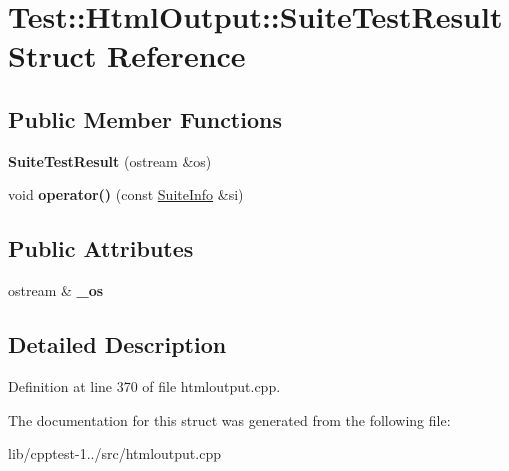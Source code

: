 \hypertarget{struct_test_1_1_html_output_1_1_suite_test_result}{}\section{Test\+:\+:Html\+Output\+:\+:Suite\+Test\+Result Struct Reference}
\label{struct_test_1_1_html_output_1_1_suite_test_result}
\subsection*{Public Member Functions}
\begin{DoxyCompactItemize}
\item 
{\bfseries Suite\+Test\+Result} (ostream \&os)\hypertarget{struct_test_1_1_html_output_1_1_suite_test_result_a4bbe1cf91cbb03755cbe3256dccdfb04}{}\label{struct_test_1_1_html_output_1_1_suite_test_result_a4bbe1cf91cbb03755cbe3256dccdfb04}

\item 
void {\bfseries operator()} (const \hyperlink{struct_test_1_1_collector_output_1_1_suite_info}{Suite\+Info} \&si)\hypertarget{struct_test_1_1_html_output_1_1_suite_test_result_ab3b121595de56c1eb22ca49c60aeb1be}{}\label{struct_test_1_1_html_output_1_1_suite_test_result_ab3b121595de56c1eb22ca49c60aeb1be}

\end{DoxyCompactItemize}
\subsection*{Public Attributes}
\begin{DoxyCompactItemize}
\item 
ostream \& {\bfseries \+\_\+os}\hypertarget{struct_test_1_1_html_output_1_1_suite_test_result_ad7f03c32f297e7010f0a091fd7b722e8}{}\label{struct_test_1_1_html_output_1_1_suite_test_result_ad7f03c32f297e7010f0a091fd7b722e8}

\end{DoxyCompactItemize}


\subsection{Detailed Description}


Definition at line 370 of file htmloutput.\+cpp.



The documentation for this struct was generated from the following file\+:\begin{DoxyCompactItemize}
\item 
lib/cpptest-\/1../src/htmloutput.\+cpp\end{DoxyCompactItemize}
